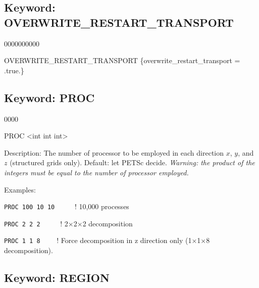 \documentclass[12pt]{article}
\begin{document}
\newpage
\protect\hypertarget{target_overwrite}{}

\subsection{Keyword: OVERWRITE\_RESTART\_TRANSPORT}
\begin{deflist}{0000000000}
\item[OVERWRITE\_RESTART\_TRANSPORT] \{overwrite\_restart\_transport = .true.\}
\end{deflist}


\newpage
\protect\hypertarget{target_proc}{}

\subsection{Keyword: PROC}

\begin{deflist}{0000}
\item[PROC] <int int int> 
\item[Description:] The number of processor to be employed in each direction $x$, $y$, and $z$ (structured grids only). Default: let PETSc decide. {\em Warning: the product of the integers must be equal to the number of processor employed.}
\item[Examples:] ~

{\tt PROC 100 10 10} \ \ \ \ \ ! 10,000 processes

{\tt PROC 2 2 2} \ \ \ \ \ ! 2$\times$2$\times$2 decomposition

{\tt PROC 1 1 8} \ \ \ \ ! Force decomposition in z direction only (1$\times$1$\times$8 decomposition).
\end{deflist}


\newpage
\protect\hypertarget{target_region}{}


\subsection{Keyword: REGION}
\end{document}
